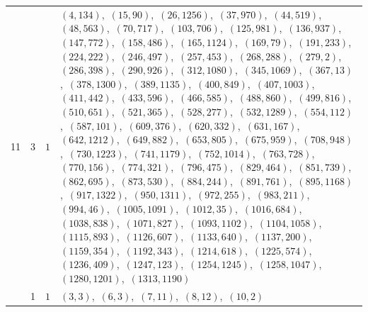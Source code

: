 \documentclass[11pt]{article}
\begin{document}
\begin{longtable}{@{}rrl>{\raggedright\arraybackslash}p{}@{}}
11 & 3 & $1$ & $(4,134)$,\allowbreak\ $(15,90)$,\allowbreak\ $(26,1256)$,\allowbreak\ $(37,970)$,\allowbreak\ $(44,519)$,\allowbreak\ $(48,563)$,\allowbreak\ $(70,717)$,\allowbreak\ $(103,706)$,\allowbreak\ $(125,981)$,\allowbreak\ $(136,937)$,\allowbreak\ $(147,772)$,\allowbreak\ $(158,486)$,\allowbreak\ $(165,1124)$,\allowbreak\ $(169,79)$,\allowbreak\ $(191,233)$,\allowbreak\ $(224,222)$,\allowbreak\ $(246,497)$,\allowbreak\ $(257,453)$,\allowbreak\ $(268,288)$,\allowbreak\ $(279,2)$,\allowbreak\ $(286,398)$,\allowbreak\ $(290,926)$,\allowbreak\ $(312,1080)$,\allowbreak\ $(345,1069)$,\allowbreak\ $(367,13)$,\allowbreak\ $(378,1300)$,\allowbreak\ $(389,1135)$,\allowbreak\ $(400,849)$,\allowbreak\ $(407,1003)$,\allowbreak\ $(411,442)$,\allowbreak\ $(433,596)$,\allowbreak\ $(466,585)$,\allowbreak\ $(488,860)$,\allowbreak\ $(499,816)$,\allowbreak\ $(510,651)$,\allowbreak\ $(521,365)$,\allowbreak\ $(528,277)$,\allowbreak\ $(532,1289)$,\allowbreak\ $(554,112)$,\allowbreak\ $(587,101)$,\allowbreak\ $(609,376)$,\allowbreak\ $(620,332)$,\allowbreak\ $(631,167)$,\allowbreak\ $(642,1212)$,\allowbreak\ $(649,882)$,\allowbreak\ $(653,805)$,\allowbreak\ $(675,959)$,\allowbreak\ $(708,948)$,\allowbreak\ $(730,1223)$,\allowbreak\ $(741,1179)$,\allowbreak\ $(752,1014)$,\allowbreak\ $(763,728)$,\allowbreak\ $(770,156)$,\allowbreak\ $(774,321)$,\allowbreak\ $(796,475)$,\allowbreak\ $(829,464)$,\allowbreak\ $(851,739)$,\allowbreak\ $(862,695)$,\allowbreak\ $(873,530)$,\allowbreak\ $(884,244)$,\allowbreak\ $(891,761)$,\allowbreak\ $(895,1168)$,\allowbreak\ $(917,1322)$,\allowbreak\ $(950,1311)$,\allowbreak\ $(972,255)$,\allowbreak\ $(983,211)$,\allowbreak\ $(994,46)$,\allowbreak\ $(1005,1091)$,\allowbreak\ $(1012,35)$,\allowbreak\ $(1016,684)$,\allowbreak\ $(1038,838)$,\allowbreak\ $(1071,827)$,\allowbreak\ $(1093,1102)$,\allowbreak\ $(1104,1058)$,\allowbreak\ $(1115,893)$,\allowbreak\ $(1126,607)$,\allowbreak\ $(1133,640)$,\allowbreak\ $(1137,200)$,\allowbreak\ $(1159,354)$,\allowbreak\ $(1192,343)$,\allowbreak\ $(1214,618)$,\allowbreak\ $(1225,574)$,\allowbreak\ $(1236,409)$,\allowbreak\ $(1247,123)$,\allowbreak\ $(1254,1245)$,\allowbreak\ $(1258,1047)$,\allowbreak\ $(1280,1201)$,\allowbreak\ $(1313,1190)$\\
\addlinespace[3pt]
13 & 1 & $1$ & $(3,3)$,\allowbreak\ $(6,3)$,\allowbreak\ $(7,11)$,\allowbreak\ $(8,12)$,\allowbreak\ $(10,2)$\\

\end{longtable}
\end{document}
